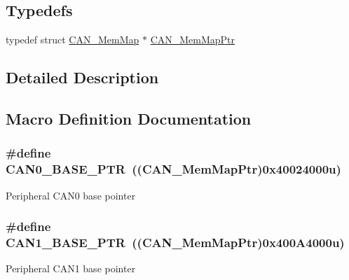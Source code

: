 \subsection*{Typedefs}
\begin{DoxyCompactItemize}
\item 
typedef struct \hyperlink{struct_c_a_n___mem_map}{C\+A\+N\+\_\+\+Mem\+Map} $\ast$ \hyperlink{group___c_a_n___peripheral_gadc219505f1f3c5212d1e670b3d57d9b6}{C\+A\+N\+\_\+\+Mem\+Map\+Ptr}
\end{DoxyCompactItemize}


\subsection{Detailed Description}


\subsection{Macro Definition Documentation}
\hypertarget{group___c_a_n___peripheral_ga1ee8f499e10af9b8e3132e0168e519b9}{}
\subsubsection[{C\+A\+N0\+\_\+\+B\+A\+S\+E\+\_\+\+P\+T\+R}]{\setlength{\rightskip}{0pt plus 5cm}\#define C\+A\+N0\+\_\+\+B\+A\+S\+E\+\_\+\+P\+T\+R~(({\bf C\+A\+N\+\_\+\+Mem\+Map\+Ptr})0x40024000u)}\label{group___c_a_n___peripheral_ga1ee8f499e10af9b8e3132e0168e519b9}
Peripheral C\+A\+N0 base pointer \hypertarget{group___c_a_n___peripheral_ga810387eeeb9ccd0e09ae057ff6f0d2ca}{}
\subsubsection[{C\+A\+N1\+\_\+\+B\+A\+S\+E\+\_\+\+P\+T\+R}]{\setlength{\rightskip}{0pt plus 5cm}\#define C\+A\+N1\+\_\+\+B\+A\+S\+E\+\_\+\+P\+T\+R~(({\bf C\+A\+N\+\_\+\+Mem\+Map\+Ptr})0x400\+A4000u)}\label{group___c_a_n___peripheral_ga810387eeeb9ccd0e09ae057ff6f0d2ca}
Peripheral C\+A\+N1 base pointer \hypertarget{group___c_a_n___peripheral_gaf9ce8b815aacb2022a8a7454f4028a6c}{}
